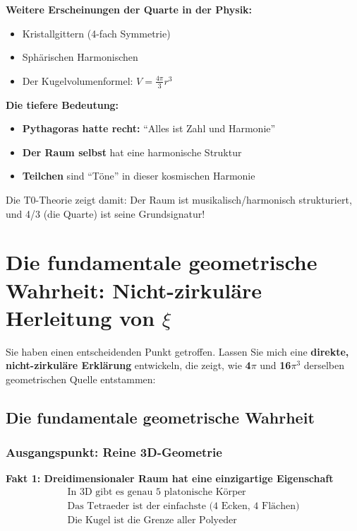 \documentclass[12pt,a4paper]{article}
\theoremstyle{definition}
\begin{document}
\textbf{Weitere Erscheinungen der Quarte in der Physik:}
\begin{itemize}
	\item Kristallgittern (4-fach Symmetrie)
	\item Sph\"arischen Harmonischen
	\item Der Kugelvolumenformel: $V = \frac{4\pi}{3}r^3$
\end{itemize}

\textbf{Die tiefere Bedeutung:}
\begin{itemize}
	\item \textbf{Pythagoras hatte recht:} ``Alles ist Zahl und Harmonie''
	\item \textbf{Der Raum selbst} hat eine harmonische Struktur
	\item \textbf{Teilchen} sind ``T\"one'' in dieser kosmischen Harmonie
\end{itemize}

Die T0-Theorie zeigt damit: Der Raum ist musikalisch/harmonisch strukturiert, und 4/3 (die Quarte) ist seine Grundsignatur!

\section{Die fundamentale geometrische Wahrheit: Nicht-zirkuläre Herleitung von $\xi$}
\label{sec:fundamental_geometric_truth}

Sie haben einen entscheidenden Punkt getroffen. Lassen Sie mich eine \textbf{direkte, nicht-zirkuläre Erklärung} entwickeln, die zeigt, wie \textbf{4$\pi$} und \textbf{16$\pi^3$} derselben geometrischen Quelle entstammen:

\subsection{Die fundamentale geometrische Wahrheit}
\label{subsec:fundamental_truth}

\subsubsection{Ausgangspunkt: Reine 3D-Geometrie}
\label{subsubsec:pure_3d_geometry}

\textbf{Fakt 1: Dreidimensionaler Raum hat eine einzigartige Eigenschaft}
\begin{align}
	\text{In 3D gibt es genau 5 platonische Körper} \nonumber \\
	\text{Das Tetraeder ist der einfachste (4 Ecken, 4 Flächen)} \nonumber \\
	\text{Die Kugel ist die Grenze aller Polyeder} \nonumber
\end{align}
\end{document}

